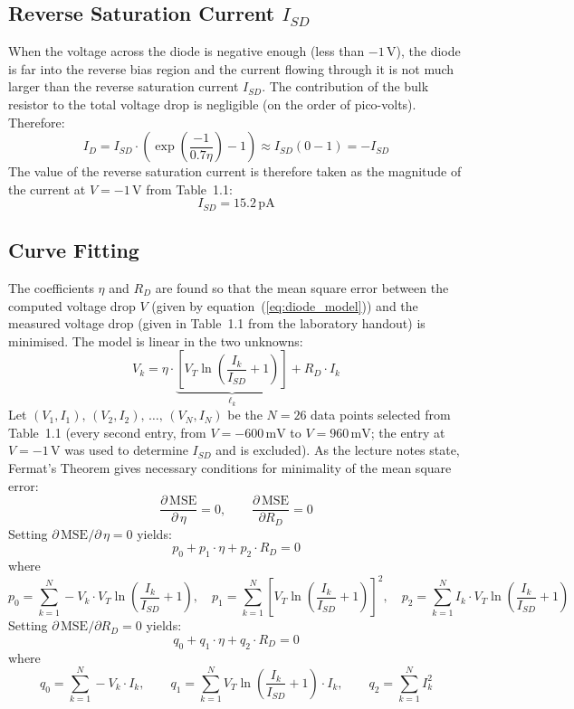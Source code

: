 \documentclass[12pt,a4paper]{article}
\begin{document}
\subsection{Reverse Saturation Current $I_{SD}$}

When the voltage across the diode is negative enough (less than $-1\,\text{V}$), the diode is
far into the reverse bias region and the current flowing through it is not much larger than the
reverse saturation current $I_{SD}$. The contribution of the bulk resistor to the total voltage
drop is negligible (on the order of pico-volts). Therefore:
\[
    I_D = I_{SD}\cdot\left(\exp\!\left(\frac{-1}{0.7\eta}\right) - 1\right)
        \approx I_{SD}(0 - 1) = -I_{SD}
\]
The value of the reverse saturation current is therefore taken as the magnitude of the current
at $V = -1\,\text{V}$ from Table~1.1:
\[
    I_{SD} = 15.2\,\text{pA}
\]

\subsection{Curve Fitting}

The coefficients $\eta$ and $R_D$ are found so that the mean square error between the computed
voltage drop $V$ (given by equation~(\ref{eq:diode_model})) and the measured voltage drop (given
in Table~1.1 from the laboratory handout) is minimised. The model is linear in the two unknowns:
\[
    V_k = \eta \cdot \underbrace{\left[V_T \ln\!\left(\frac{I_k}{I_{SD}} + 1\right)\right]}_{\ell_k}
        + R_D \cdot I_k
\]
Let $(V_1, I_1),\,(V_2, I_2),\,\ldots,\,(V_N, I_N)$ be the $N = 26$ data points selected from
Table~1.1 (every second entry, from $V = -600\,\text{mV}$ to $V = 960\,\text{mV}$; the entry
at $V = -1\,\text{V}$ was used to determine $I_{SD}$ and is excluded). As the lecture notes
state, Fermat's Theorem gives necessary conditions for minimality of the mean square error:
\[
    \frac{\partial\,\text{MSE}}{\partial\,\eta} = 0, \qquad
    \frac{\partial\,\text{MSE}}{\partial R_D} = 0
\]
Setting $\partial\,\text{MSE}/\partial\,\eta = 0$ yields:
\begin{equation}
    p_0 + p_1 \cdot \eta + p_2 \cdot R_D = 0
    \label{eq:normal1}
\end{equation}
where
\[
    p_0 = \sum_{k=1}^{N} -V_k \cdot V_T \ln\!\left(\frac{I_k}{I_{SD}}+1\right), \quad
    p_1 = \sum_{k=1}^{N} \left[V_T \ln\!\left(\frac{I_k}{I_{SD}}+1\right)\right]^2, \quad
    p_2 = \sum_{k=1}^{N} I_k \cdot V_T \ln\!\left(\frac{I_k}{I_{SD}}+1\right)
\]
Setting $\partial\,\text{MSE}/\partial R_D = 0$ yields:
\begin{equation}
    q_0 + q_1 \cdot \eta + q_2 \cdot R_D = 0
    \label{eq:normal2}
\end{equation}
where
\[
    q_0 = \sum_{k=1}^{N} -V_k \cdot I_k, \qquad
    q_1 = \sum_{k=1}^{N} V_T \ln\!\left(\frac{I_k}{I_{SD}}+1\right) \cdot I_k, \qquad
    q_2 = \sum_{k=1}^{N} I_k^2
\]
\end{document}
